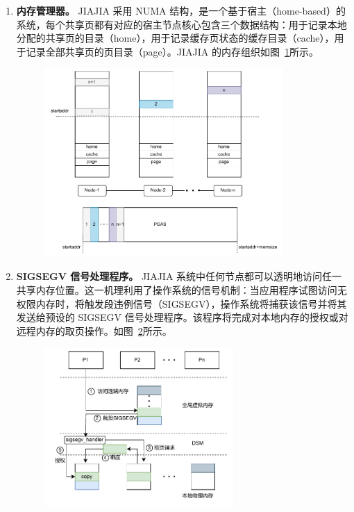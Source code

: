 {\begin{enumerate}[label=\arabic*.]
        \item \textbf{内存管理器。} JIAJIA 采用 NUMA 结构，是一个基于宿主（home-based）的系统，每个共享页都有对应的宿主节点核心包含三个数据结构：用于记录本地分配的共享页的目录（home），用于记录缓存页状态的缓存目录（cache），用于记录全部共享页的页目录（page）。JIAJIA 的内存组织如图~\ref{fig:JIAJIA-memory}所示。
              \begin{figure}[!htbp]
                  \centering
                  \includegraphics[width=0.86\textwidth]{Img/JIAJIA内存组织.drawio.pdf}
                  \label{fig:JIAJIA-memory}
              \end{figure}

        \item \textbf{SIGSEGV 信号处理程序。} JIAJIA 系统中任何节点都可以透明地访问任一共享内存位置。这一机理利用了操作系统的信号机制：当应用程序试图访问无权限内存时，将触发段违例信号（SIGSEGV），操作系统将捕获该信号并将其发送给预设的 SIGSEGV 信号处理程序。该程序将完成对本地内存的授权或对远程内存的取页操作。如图~\ref{fig:JIAJIA-access}所示。
              \begin{figure}[!htbp]
                  \centering
                  \includegraphics[width=0.68\textwidth]{Img/JIAJIA访问远端内存.drawio.pdf}
                  \label{fig:JIAJIA-access}
              \end{figure}


\end{enumerate}}
